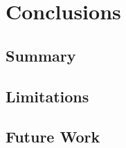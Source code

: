 \chapter{Conclusions}\label{ch:conclusions}

\section{Summary}\label{sec:summary}

\section{Limitations}\label{sec:limitations}

\section{Future Work}\label{sec:future-work}
